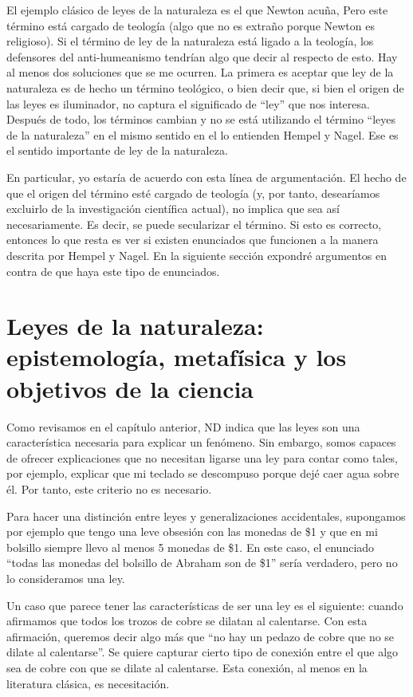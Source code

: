 El ejemplo clásico de leyes de la naturaleza es el que Newton acuña, Pero este término está cargado de teología (algo que no es extraño porque Newton es religioso). Si el término de ley de la naturaleza está ligado a la teología, los defensores del anti-humeanismo tendrían algo que decir al respecto de esto. Hay al menos dos soluciones que se me ocurren. La primera es aceptar que ley de la naturaleza es de hecho un término teológico, o bien decir que, si bien el origen de las leyes es iluminador, no captura el significado de ``ley'' que nos interesa. Después de todo, los términos cambian y no se está utilizando el término ``leyes de la naturaleza'' en el mismo sentido en el lo entienden Hempel y Nagel. Ese es el sentido importante de ley de la naturaleza.

En particular, yo estaría de acuerdo con esta línea de argumentación. El hecho de que el origen del término esté cargado de teología (y, por tanto, desearíamos excluirlo de la investigación científica actual), no implica que sea así necesariamente. Es decir, se puede secularizar el término. Si esto es correcto, entonces lo que resta es ver si existen enunciados que funcionen a la manera descrita por Hempel y Nagel. En la siguiente sección expondré argumentos en contra de que haya este tipo de enunciados.

\section{Leyes de la naturaleza: epistemología, metafísica y los objetivos de la ciencia}

Como revisamos en el capítulo anterior, ND indica que las leyes son una característica necesaria para explicar un fenómeno. Sin embargo, somos capaces de ofrecer explicaciones que no necesitan ligarse una ley para contar como tales, por ejemplo, explicar que mi teclado se descompuso porque dejé caer agua sobre él. Por tanto, este criterio no es necesario.

Para hacer una distinción entre leyes y generalizaciones accidentales, supongamos por ejemplo que tengo una leve obsesión con las monedas de \$1 y que en mi bolsillo siempre llevo al menos 5 monedas de \$1. En este caso, el enunciado ``todas las monedas del bolsillo de Abraham son de \$1'' sería verdadero, pero no lo consideramos una ley.

Un caso que parece tener las características de ser una ley es el siguiente: cuando afirmamos que todos los trozos de cobre se dilatan al calentarse.  Con esta afirmación, queremos decir algo más que ``no hay un pedazo de cobre que no se dilate al calentarse''. Se quiere capturar cierto tipo de conexión entre el que algo sea de cobre con que se dilate al calentarse. Esta conexión, al menos en la literatura clásica, es necesitación.

